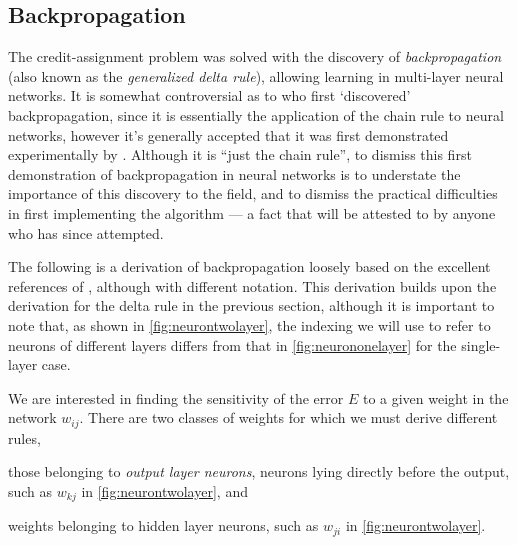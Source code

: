 \documentclass[thesis]{subfiles}
\begin{document}
\subsection{Backpropagation}
The credit-assignment problem was solved with the discovery of \emph{backpropagation} (also known as the \emph{generalized delta rule}), allowing learning in multi-layer neural networks. It is somewhat controversial as to who first `discovered' backpropagation, since it is essentially the application of the chain rule to neural networks, however it's generally accepted that it was first demonstrated experimentally by \citet{rumelhartbackprop}. Although it is ``just the chain rule'', to dismiss this first demonstration of backpropagation in neural networks is to understate the importance of this discovery to the field, and to dismiss the practical difficulties in first implementing the algorithm --- a fact that will be attested to by anyone who has since attempted.

The following is a derivation of backpropagation loosely based on the excellent references of \citet{haykin1994neural,Bishop1995}, although with different notation. This derivation builds upon the derivation for the delta rule in the previous section, although it is important to note that, as shown in \cref{fig:neurontwolayer}, the indexing we will use to refer to neurons of different layers differs from that in \cref{fig:neurononelayer} for the single-layer case.

We are interested in finding the sensitivity of the error $E$ to a given weight in the network $w_{ij}$. There are two classes of weights for which we must derive different rules, 
\begin{enumerate*}[label= (\textbf{\roman*})]
  \item\label{enum:outputneuron} those belonging to \emph{output layer neurons}, \ie neurons lying directly before the output, such as $w_{kj}$ in \cref{fig:neurontwolayer}, and
  \item\label{enum:hiddenneuron} weights belonging to hidden layer neurons, such as $w_{ji}$ in \cref{fig:neurontwolayer}.
\end{enumerate*}
%
\end{document}
